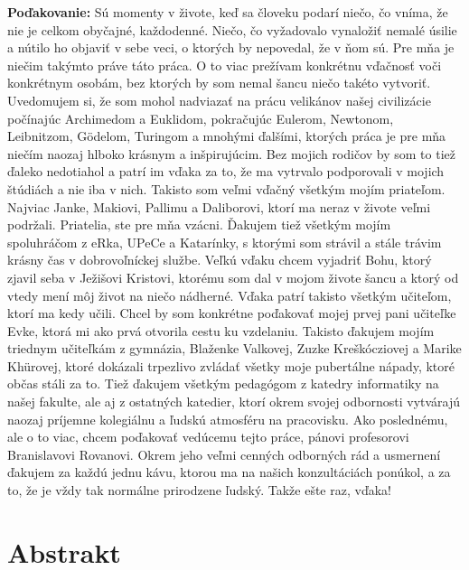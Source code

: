 \documentclass[12pt, oneside]{book}
\begin{document}
\vfill
{\bf Poďakovanie:}
Sú momenty v živote, keď sa človeku podarí niečo, čo vníma, že nie je celkom obyčajné, každodenné. Niečo, čo vyžadovalo vynaložiť nemalé úsilie a nútilo ho objaviť v sebe veci, o ktorých by nepovedal, že v ňom sú. Pre mňa je niečim takýmto práve táto práca. O to viac prežívam konkrétnu vďačnosť voči konkrétnym osobám, bez ktorých by som nemal šancu niečo takéto vytvoriť. Uvedomujem si, že som mohol nadviazať na prácu velikánov našej civilizácie počínajúc Archimedom a Euklidom, pokračujúc Eulerom, Newtonom, Leibnitzom, Gödelom, Turingom a mnohými ďalšími, ktorých práca je pre mňa niečím naozaj hlboko krásnym a inšpirujúcim. Bez mojich rodičov by som to tiež ďaleko nedotiahol a patrí im vďaka za to, že ma vytrvalo podporovali v mojich štúdiách a nie iba v nich. Takisto som veľmi vďačný všetkým mojím priateľom. Najviac Janke, Makiovi, Pallimu a Daliborovi, ktorí ma neraz v živote veľmi podržali. Priatelia, ste pre mňa vzácni. Ďakujem tiež všetkým mojím spoluhráčom z eRka, UPeCe a Katarínky, s ktorými som strávil a stále trávim krásny čas v dobrovoľníckej službe. Veľkú vďaku chcem vyjadriť Bohu, ktorý zjavil seba v Ježišovi Kristovi, ktorému som dal v mojom živote šancu a ktorý od vtedy mení môj život na niečo nádherné. Vďaka patrí takisto všetkým učiteľom, ktorí ma kedy učili. Chcel by som konkrétne poďakovať mojej prvej pani učiteľke Evke, ktorá mi ako prvá otvorila cestu ku vzdelaniu. Takisto ďakujem mojím triednym učiteľkám z gymnázia, Blaženke Valkovej, Zuzke Kreškócziovej a Marike Khürovej, ktoré dokázali trpezlivo zvládať všetky moje pubertálne nápady, ktoré občas stáli za to. Tiež ďakujem všetkým pedagógom z katedry informatiky na našej fakulte, ale aj z ostatných katedier, ktorí okrem svojej odbornosti vytvárajú naozaj príjemne kolegiálnu a ľudskú atmosféru na pracovisku. Ako poslednému, ale o to viac, chcem poďakovať vedúcemu tejto práce, pánovi profesorovi Branislavovi Rovanovi. Okrem jeho veľmi cenných odborných rád a usmernení ďakujem za každú jednu kávu, ktorou ma na našich konzultáciách ponúkol, a za to, že je vždy tak normálne prirodzene ľudský. Takže ešte raz, vďaka!


\newpage 
\section*{Abstrakt}
\end{document}
